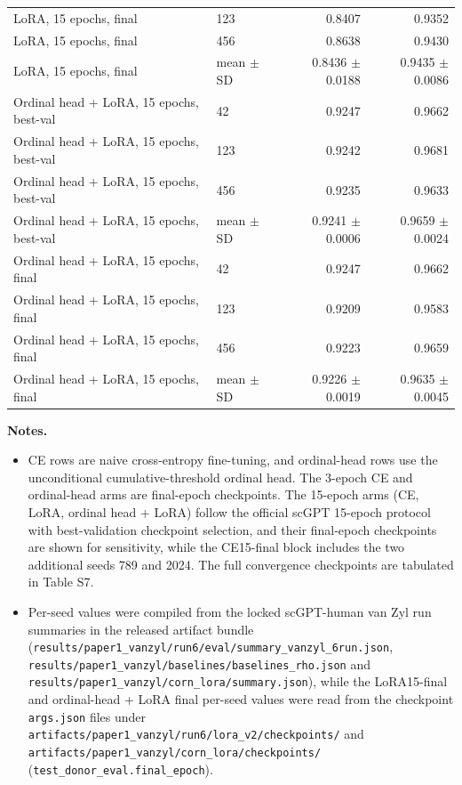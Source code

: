 \documentclass[12pt,a4paper]{article}
\begin{document}
{\begin{tabular}{llrr}
LoRA, 15 epochs, final & 123 & 0.8407 & 0.9352 \\
LoRA, 15 epochs, final & 456 & 0.8638 & 0.9430 \\
LoRA, 15 epochs, final & mean $\pm$ SD & 0.8436 $\pm$ 0.0188 & 0.9435 $\pm$ 0.0086 \\
\addlinespace[4pt]
Ordinal head + LoRA, 15 epochs, best-val & 42 & 0.9247 & 0.9662 \\
Ordinal head + LoRA, 15 epochs, best-val & 123 & 0.9242 & 0.9681 \\
Ordinal head + LoRA, 15 epochs, best-val & 456 & 0.9235 & 0.9633 \\
Ordinal head + LoRA, 15 epochs, best-val & mean $\pm$ SD & 0.9241 $\pm$ 0.0006 & 0.9659 $\pm$ 0.0024 \\
\addlinespace[4pt]
Ordinal head + LoRA, 15 epochs, final & 42 & 0.9247 & 0.9662 \\
Ordinal head + LoRA, 15 epochs, final & 123 & 0.9209 & 0.9583 \\
Ordinal head + LoRA, 15 epochs, final & 456 & 0.9223 & 0.9659 \\
Ordinal head + LoRA, 15 epochs, final & mean $\pm$ SD & 0.9226 $\pm$ 0.0019 & 0.9635 $\pm$ 0.0045 \\
\bottomrule
\end{tabular}%
}
\endgroup

\textbf{Notes.}
\begin{itemize}
  \item CE rows are naive cross-entropy fine-tuning, and ordinal-head rows use the unconditional cumulative-threshold ordinal head. The 3-epoch CE and ordinal-head arms are final-epoch checkpoints. The 15-epoch arms (CE, LoRA, ordinal head + LoRA) follow the official scGPT 15-epoch protocol with best-validation checkpoint selection, and their final-epoch checkpoints are shown for sensitivity, while the CE15-final block includes the two additional seeds 789 and 2024. The full convergence checkpoints are tabulated in Table S7.
  \item Per-seed values were compiled from the locked scGPT-human van Zyl run summaries in the released artifact bundle (\texttt{results/paper1\_vanzyl/run6/eval/summary\_vanzyl\_6run.json}, \texttt{results/paper1\_vanzyl/baselines/baselines\_rho.json} and \texttt{results/paper1\_vanzyl/corn\_lora/summary.json}), while the LoRA15-final and ordinal-head + LoRA final per-seed values were read from the checkpoint \texttt{args.json} files under \texttt{artifacts/paper1\_vanzyl/run6/lora\_v2/checkpoints/} and \texttt{artifacts/paper1\_vanzyl/corn\_lora/checkpoints/} (\texttt{test\_donor\_eval.final\_epoch}).
\end{itemize}
\end{document}
